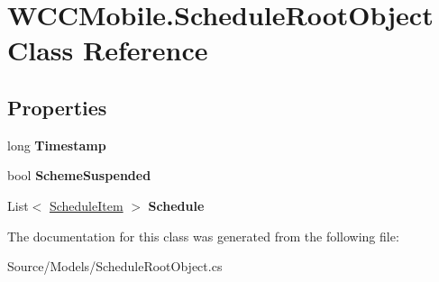 \hypertarget{class_w_c_c_mobile_1_1_schedule_root_object}{}\section{W\+C\+C\+Mobile.\+Schedule\+Root\+Object Class Reference}
\label{class_w_c_c_mobile_1_1_schedule_root_object}
\subsection*{Properties}
\begin{DoxyCompactItemize}
\item 
long {\bfseries Timestamp}\hypertarget{class_w_c_c_mobile_1_1_schedule_root_object_a47a015576c0adf06f2274ff294b1319b}{}\label{class_w_c_c_mobile_1_1_schedule_root_object_a47a015576c0adf06f2274ff294b1319b}

\item 
bool {\bfseries Scheme\+Suspended}\hypertarget{class_w_c_c_mobile_1_1_schedule_root_object_a99115104f9ae84b517c43bfc7ffd053d}{}\label{class_w_c_c_mobile_1_1_schedule_root_object_a99115104f9ae84b517c43bfc7ffd053d}

\item 
List$<$ \hyperlink{class_w_c_c_mobile_1_1_models_1_1_schedule_item}{Schedule\+Item} $>$ {\bfseries Schedule}\hypertarget{class_w_c_c_mobile_1_1_schedule_root_object_a5e12dc3ab3b5c1160726b69f66847929}{}\label{class_w_c_c_mobile_1_1_schedule_root_object_a5e12dc3ab3b5c1160726b69f66847929}

\end{DoxyCompactItemize}


The documentation for this class was generated from the following file\+:\begin{DoxyCompactItemize}
\item 
Source/\+Models/Schedule\+Root\+Object.\+cs\end{DoxyCompactItemize}
